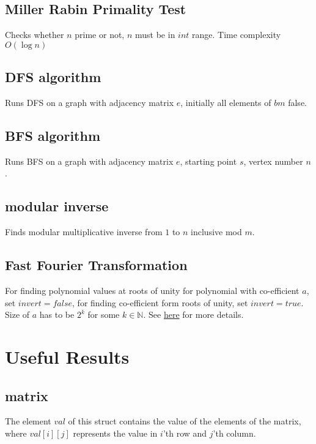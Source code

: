 \documentclass[8pt, a4paper, twocolumn]{article}
\begin{document}
\subsection{Miller Rabin Primality Test}
Checks whether $n$ prime or not, $n$ must be in $int$ range. Time complexity $O(\log n)$


\subsection{DFS algorithm}
Runs DFS on a graph with adjacency matrix $e$, initially all elements of $bm$ false.


\subsection{BFS algorithm}
Runs BFS on a graph with adjacency matrix $e$, starting point $s$, vertex number $n$.


\subsection{modular inverse}
Finds modular multiplicative inverse from $1$ to $n$ inclusive mod $m$.


\subsection{Fast Fourier Transformation}
For finding polynomial values at roots of unity for polynomial with co-efficient $a$, set $invert=false$, for finding co-efficient form roots of unity, set $invert=true$. Size of $a$ has to be $2^k$ for some $k\in\mathbb{N}$. See \href{https://cp-algorithms.com/algebra/fft.html}{here} for more details.


\section{Useful Results}

\subsection{matrix}
The element $val$ of this struct contains the value of the elements of the matrix, where $val[i][j]$ represents the value in $i$'th row and $j$'th column.

\end{document}
